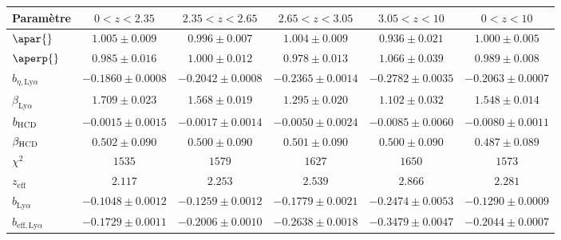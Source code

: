 \begin{table}[h]
\begin{tabular}{lccccc}
\toprule
Param\`etre  & $\num{0} < z < \num{2.35}$ & $\num{2.35} < z < \num{2.65}$ & $\num{2.65} < z < \num{3.05}$ & $\num{3.05} < z < \num{10}$  & $\num{0} < z < \num{10}$ \\
\midrule
$\apar{} $ & $ 1.005 \pm 0.009$ & $ 0.996 \pm 0.007$ & $ 1.004 \pm 0.009$ & $ 0.936 \pm 0.021$ & $ 1.000 \pm 0.005$ \\
$\aperp{} $ & $ 0.985 \pm 0.016$ & $ 1.000 \pm 0.012$ & $ 0.978 \pm 0.013$ & $ 1.066 \pm 0.039$ & $ 0.989 \pm 0.008$ \\
$b_{\eta, \mathrm{Ly}\alpha} $ & $ -0.1860 \pm 0.0008$ & $ -0.2042 \pm 0.0008$ & $ -0.2365 \pm 0.0014$ & $ -0.2782 \pm 0.0035$ & $ -0.2063 \pm 0.0007$ \\
$\beta_{\mathrm{Ly}\alpha} $ & $ 1.709 \pm 0.023$ & $ 1.568 \pm 0.019$ & $ 1.295 \pm 0.020$ & $ 1.102 \pm 0.032$ & $ 1.548 \pm 0.014$ \\
$b_{\textsc{HCD}} $ & $ -0.0015 \pm 0.0015$ & $ -0.0017 \pm 0.0014$ & $ -0.0050 \pm 0.0024$ & $ -0.0085 \pm 0.0060$ & $ -0.0080 \pm 0.0011$ \\
$\beta_{\textsc{HCD}} $ & $ 0.502 \pm 0.090$ & $ 0.500 \pm 0.090$ & $ 0.501 \pm 0.090$ & $ 0.500 \pm 0.090$ & $ 0.487 \pm 0.089$ \\
\midrule
$\chi^2$ & $ 1535 $ & $ 1579 $ & $ 1627 $ & $ 1650 $ & $ 1573 $ \\
$z_{\mathrm{eff}}$ & $ 2.117 $ & $ 2.253 $ & $ 2.539 $ & $ 2.866 $ & $ 2.281 $ \\
\midrule
$b_{\mathrm{Ly}\alpha} $ & $ -0.1048 \pm 0.0012$ & $ -0.1259 \pm 0.0012$ & $ -0.1779 \pm 0.0021$ & $ -0.2474 \pm 0.0053$ & $ -0.1290 \pm 0.0009$ \\
$b_{\mathrm{eff}, \mathrm{Ly}\alpha} $ & $ -0.1729 \pm 0.0011$ & $ -0.2006 \pm 0.0010$ & $ -0.2638 \pm 0.0018$ & $ -0.3479 \pm 0.0047$ & $ -0.2044 \pm 0.0007$ \\
\bottomrule
  \end{tabular}
\end{table}

